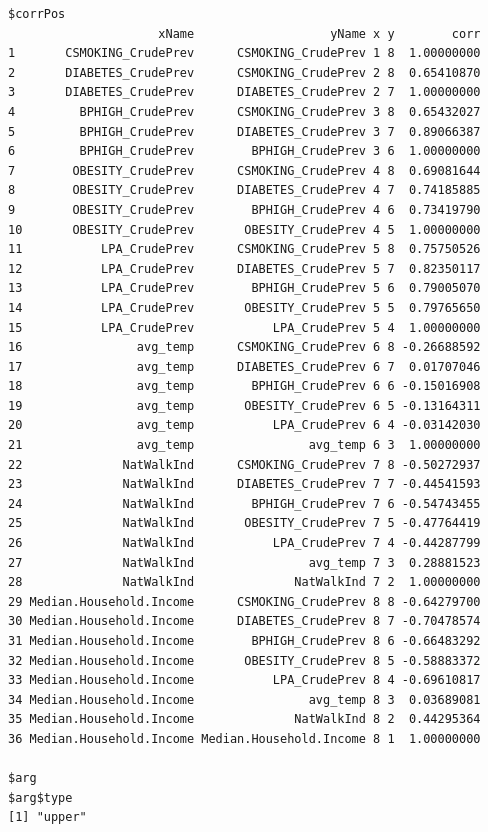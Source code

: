 \documentclass[
]{article}
\begin{document}
\begin{verbatim}
$corrPos
                     xName                   yName x y        corr
1       CSMOKING_CrudePrev      CSMOKING_CrudePrev 1 8  1.00000000
2       DIABETES_CrudePrev      CSMOKING_CrudePrev 2 8  0.65410870
3       DIABETES_CrudePrev      DIABETES_CrudePrev 2 7  1.00000000
4         BPHIGH_CrudePrev      CSMOKING_CrudePrev 3 8  0.65432027
5         BPHIGH_CrudePrev      DIABETES_CrudePrev 3 7  0.89066387
6         BPHIGH_CrudePrev        BPHIGH_CrudePrev 3 6  1.00000000
7        OBESITY_CrudePrev      CSMOKING_CrudePrev 4 8  0.69081644
8        OBESITY_CrudePrev      DIABETES_CrudePrev 4 7  0.74185885
9        OBESITY_CrudePrev        BPHIGH_CrudePrev 4 6  0.73419790
10       OBESITY_CrudePrev       OBESITY_CrudePrev 4 5  1.00000000
11           LPA_CrudePrev      CSMOKING_CrudePrev 5 8  0.75750526
12           LPA_CrudePrev      DIABETES_CrudePrev 5 7  0.82350117
13           LPA_CrudePrev        BPHIGH_CrudePrev 5 6  0.79005070
14           LPA_CrudePrev       OBESITY_CrudePrev 5 5  0.79765650
15           LPA_CrudePrev           LPA_CrudePrev 5 4  1.00000000
16                avg_temp      CSMOKING_CrudePrev 6 8 -0.26688592
17                avg_temp      DIABETES_CrudePrev 6 7  0.01707046
18                avg_temp        BPHIGH_CrudePrev 6 6 -0.15016908
19                avg_temp       OBESITY_CrudePrev 6 5 -0.13164311
20                avg_temp           LPA_CrudePrev 6 4 -0.03142030
21                avg_temp                avg_temp 6 3  1.00000000
22              NatWalkInd      CSMOKING_CrudePrev 7 8 -0.50272937
23              NatWalkInd      DIABETES_CrudePrev 7 7 -0.44541593
24              NatWalkInd        BPHIGH_CrudePrev 7 6 -0.54743455
25              NatWalkInd       OBESITY_CrudePrev 7 5 -0.47764419
26              NatWalkInd           LPA_CrudePrev 7 4 -0.44287799
27              NatWalkInd                avg_temp 7 3  0.28881523
28              NatWalkInd              NatWalkInd 7 2  1.00000000
29 Median.Household.Income      CSMOKING_CrudePrev 8 8 -0.64279700
30 Median.Household.Income      DIABETES_CrudePrev 8 7 -0.70478574
31 Median.Household.Income        BPHIGH_CrudePrev 8 6 -0.66483292
32 Median.Household.Income       OBESITY_CrudePrev 8 5 -0.58883372
33 Median.Household.Income           LPA_CrudePrev 8 4 -0.69610817
34 Median.Household.Income                avg_temp 8 3  0.03689081
35 Median.Household.Income              NatWalkInd 8 2  0.44295364
36 Median.Household.Income Median.Household.Income 8 1  1.00000000

$arg
$arg$type
[1] "upper"
\end{verbatim}
\end{document}
